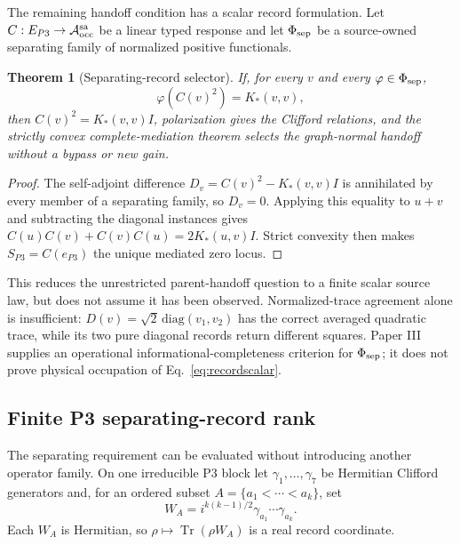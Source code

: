 \documentclass[11pt]{article}
\newtheorem{theorem}{Theorem}
\newcommand{\Tr}{\operatorname{Tr}}
\begin{document}
The remaining handoff condition has a scalar record formulation.  Let
$C:E_{P3}\to\mathcal A_{\rm occ}^{\rm sa}$ be a linear typed response and
let $\Phi_{\rm sep}$ be a source-owned separating family of normalized
positive functionals.

\begin{theorem}[Separating-record selector]
\label{thm:recordselector}
If, for every $v$ and every $\varphi\in\Phi_{\rm sep}$,
\begin{equation}
 \varphi(C(v)^2)=K_*(v,v),
 \label{eq:recordscalar}
\end{equation}
then $C(v)^2=K_*(v,v)I$, polarization gives the Clifford relations, and the
strictly convex complete-mediation theorem selects the graph-normal handoff
without a bypass or new gain.
\end{theorem}

\begin{proof}
The self-adjoint difference
$D_v=C(v)^2-K_*(v,v)I$ is annihilated by every member of a separating family,
so $D_v=0$.  Applying this equality to $u+v$ and subtracting the diagonal
instances gives
$C(u)C(v)+C(v)C(u)=2K_*(u,v)I$.  Strict convexity then makes
$S_{P3}=C(e_{P3})$ the unique mediated zero locus.
\end{proof}

This reduces the unrestricted parent-handoff question to a finite scalar source law,
but does not assume it has been observed.  Normalized-trace agreement alone is
insufficient: $D(v)=\sqrt2\,\mathrm{diag}(v_1,v_2)$ has the correct averaged
quadratic trace, while its two pure diagonal records return different
squares.  Paper III supplies an operational informational-completeness
criterion for $\Phi_{\rm sep}$; it does not prove physical occupation of
Eq.~\eqref{eq:recordscalar}.

\subsection{Finite P3 separating-record rank}

The separating requirement can be evaluated without introducing another
operator family. On one irreducible P3 block let
$\gamma_1,\ldots,\gamma_7$ be Hermitian Clifford generators and, for an
ordered subset $A=\{a_1<\cdots<a_k\}$, set
\begin{equation}
 W_A=i^{k(k-1)/2}\gamma_{a_1}\cdots\gamma_{a_k}.
 \label{eq:cliffordwords}
\end{equation}
Each $W_A$ is Hermitian, so $\rho\mapsto\Tr(\rho W_A)$ is a real record
coordinate.
\end{document}
